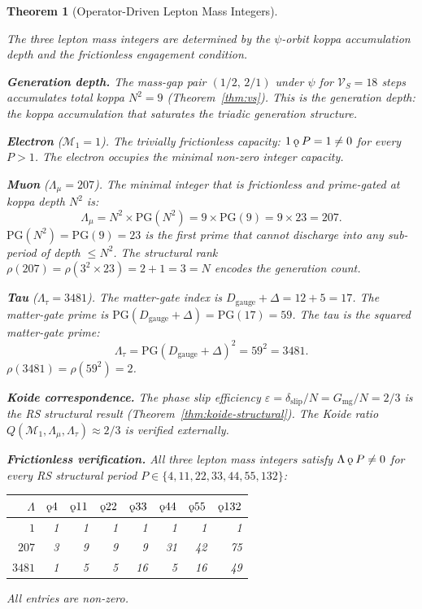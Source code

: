 \documentclass[11pt,letterpaper]{article}
\theoremstyle{plain}
\newtheorem{theorem}{Theorem}[section]
\theoremstyle{definition}
\theoremstyle{remark}
\newcommand{\rank}{\rho}
\newcommand{\koppa}{\mathbin{\text{\rm\k{o}}}}
\newcommand{\Dg}{D_{\mathrm{gauge}}}
\newcommand{\VS}{\mathcal{V}_S}
\newcommand{\PG}{\mathrm{PG}}
\newcommand{\Gmg}{G_{\mathrm{mg}}}
\newcommand{\dslip}{\delta_{\mathrm{slip}}}
\newcommand{\Lambdamu}{\Lambda_\mu}
\newcommand{\Lambdatau}{\Lambda_\tau}
\begin{document}
\begin{theorem}[Operator-Driven Lepton Mass
Integers]\label{thm:leptons}
\begin{rsbox}
The three lepton mass integers are determined by the $\psi$-orbit
koppa accumulation depth and the frictionless engagement condition.

\medskip\noindent\textbf{Generation depth.}
The mass-gap pair $(1/2,\,2/1)$ under $\psi$ for $\VS=18$ steps
accumulates total koppa $N^2=9$ (Theorem~\ref{thm:vs}).  This is
the generation depth: the koppa accumulation that saturates the
triadic generation structure.

\medskip\noindent\textbf{Electron} ($\mathcal{M}_1=1$).
The trivially frictionless capacity: $1\koppa P=1\neq0$ for every
$P>1$.  The electron occupies the minimal non-zero integer capacity.

\medskip\noindent\textbf{Muon} ($\Lambdamu=207$).
The minimal integer that is frictionless and prime-gated at koppa
depth $N^2$ is:
\[
\Lambdamu = N^2\times\PG(N^2) = 9\times\PG(9) = 9\times23 = 207.
\]
$\PG(N^2)=\PG(9)=23$ is the first prime that cannot discharge into
any sub-period of depth $\leq N^2$.  The structural rank
$\rank(207)=\rank(3^2\times23)=2+1=3=N$ encodes the generation count.

\medskip\noindent\textbf{Tau} ($\Lambdatau=3481$).
The matter-gate index is $\Dg+\Delta=12+5=17$.  The matter-gate
prime is $\PG(\Dg+\Delta)=\PG(17)=59$.  The tau is the squared
matter-gate prime:
\[
\Lambdatau = \PG(\Dg+\Delta)^2 = 59^2 = 3481.
\]
$\rank(3481)=\rank(59^2)=2$.

\medskip\noindent\textbf{Koide correspondence.}
The phase slip efficiency $\varepsilon=\dslip/N=\Gmg/N=2/3$ is the
RS structural result (Theorem~\ref{thm:koide-structural}).  The
Koide ratio $Q(\mathcal{M}_1,\Lambdamu,\Lambdatau)\approx2/3$ is
verified externally.

\medskip\noindent\textbf{Frictionless verification.}
All three lepton mass integers satisfy $\Lambda\koppa P\neq0$ for
every RS structural period $P\in\{4,11,22,33,44,55,132\}$:
\begin{center}
\small
\begin{tabular}{rrrrrrrr}
\toprule
$\Lambda$ & $\koppa4$ & $\koppa11$ & $\koppa22$ & $\koppa33$
  & $\koppa44$ & $\koppa55$ & $\koppa132$ \\
\midrule
$1$    & 1 & 1 & 1  & 1  & 1  & 1  & 1  \\
$207$  & 3 & 9 & 9  & 9  & 31 & 42 & 75 \\
$3481$ & 1 & 5 & 5  & 16 & 5  & 16 & 49 \\
\bottomrule
\end{tabular}
\end{center}
All entries are non-zero.
\end{rsbox}
\end{theorem}
\end{document}

